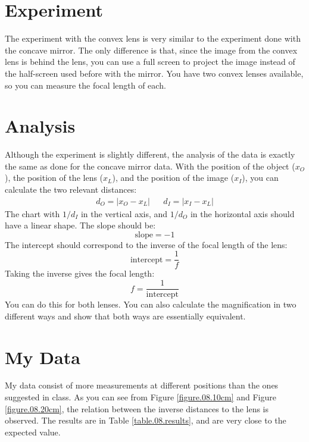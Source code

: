 \section{Experiment}
The experiment with the convex lens is very similar to the experiment done with the concave mirror. The only difference is that, since the image from the convex lens is behind the lens, you can use a full screen to project the image instead of the half-screen used before with the mirror. You have two convex lenses available, so you can measure the focal length of each.
\section{Analysis}
Although the experiment is slightly different, the analysis of the data is exactly the same as done for the concave mirror data. With the position of the object ($x_{O}$), the position of the lens ($x_{L}$), and the position of the image ($x_{I}$), you can calculate the two relevant distances:
\begin{align}
    d_{O} = \left\vert x_{O} - x_{L} \right\vert && d_{I} = \left\vert x_{I} - x_{L} \right\vert
\end{align}
The chart with $1/d_{I}$ in the vertical axis, and $1/d_{O}$ in the horizontal axis should have a linear shape. The slope should be:
\begin{equation}
    \text{slope} = -1
\end{equation}
The intercept should correspond to the inverse of the focal length of the lens:
\begin{equation}
    \text{intercept} = \frac{1}{f}
\end{equation}
Taking the inverse gives the focal length:
\begin{equation}
    f = \frac{1}{\text{intercept}}
\end{equation}
You can do this for both lenses. You can also calculate the magnification in two different ways and show that both ways are essentially equivalent.
\section{My Data}
My data consist of more measurements at different positions than the ones suggested in class. As you can see from Figure \ref{figure.08.10cm} and Figure \ref{figure.08.20cm}, the relation between the inverse distances to the lens is observed. The results are in Table \ref{table.08.results}, and are very close to the expected value.

